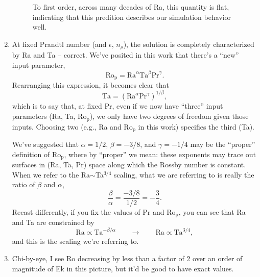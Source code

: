 \documentclass[aps, pre, onecolumn, nofootinbib, notitlepage, groupedaddress, amsfonts, amssymb, amsmath, longbibliography, superscriptaddress]{revtex4-1}
\begin{document}
\begin{enumerate}
\begin{figure}[t!]
{	To first order, across many decades of Ra, this quantity is flat, indicating that this predition describes our simulation behavior well.
	\label{fig:ro_p_boundary_layers} }
\end{figure}
\item At fixed Prandtl number (and $\epsilon$, $n_\rho$), the solution is completely characterized by Ra and Ta -- correct.
We've posited in this work that there's a ``new'' input parameter,
\begin{equation}
\text{Ro}_\text{p} = \text{Ra}^\alpha\text{Ta}^\beta\text{Pr}^{\gamma}.
\end{equation}
Rearranging this expression, it becomes clear that
\begin{equation}
\text{Ta} = \left(\text{Ra}^\alpha\text{Pr}^{\gamma}\right)^{1/\beta},
\end{equation}
which is to say that, at fixed Pr, even if we now have ``three'' input parameters (Ra, Ta, Ro$_{\text{p}}$), we only have two degrees of freedom given those inputs.
Choosing two (e.g., Ra and Ro$_\text{p}$ in this work) specifies the third (Ta).

We've suggested that $\alpha = 1/2$, $\beta = -3/8$, and $\gamma = -1/4$ may be the ``proper'' definition of Ro$_{\text{p}}$, where by ``proper'' we mean: these exponents may trace out surfaces in (Ra, Ta, Pr) space along which the Rossby number is constant.
When we refer to the Ra$\sim$Ta$^{3/4}$ scaling, what we are referring to is really the ratio of $\beta$ and $\alpha$,
$$
\frac{\beta}{\alpha} = \frac{-3/8}{1/2} = -\frac{3}{4}.
$$
Recast differently, if you fix the values of Pr and Ro$_{\text{p}}$, you can see that Ra and Ta are constrained by
$$
\text{Ra} \propto \text{Ta}^{-\beta/\alpha} \qquad\rightarrow\qquad
\text{Ra} \propto \text{Ta}^{3/4},
$$
and this is the scaling we're referring to.
\item Chi-by-eye, I see Ro decreasing by less than a factor of 2 over an order of magnitude of Ek in this picture, but it'd be good to have exact values.

\end{enumerate}
\end{document}
